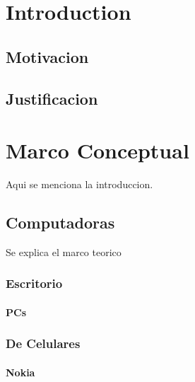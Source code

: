 \documentclass[12pt]{book}
\begin{document}
\chapter{Introduction}
\section{Motivacion}
\section{Justificacion}
\chapter{Marco Conceptual} 
Aqui se menciona la introduccion.
\section{Computadoras} 
Se explica el marco teorico
\subsection{Escritorio}
\subsubsection{PCs}
\subsection{De Celulares}
\subsubsection{Nokia}
\end{document}
